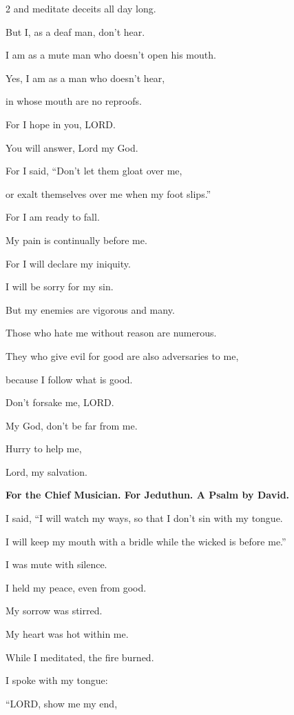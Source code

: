 \begin{multicols}{2}
	and meditate deceits all day long.
	
	
	\myverse{}But I, as a deaf man, don’t hear.
	
	I am as a mute man who doesn’t open his mouth.
	
	
	\myverse{}Yes, I am as a man who doesn’t hear,
	
	in whose mouth are no reproofs.
	
	
	\myverse{}For I hope in you, LORD.
	
	You will answer, Lord my God.
	
	
	\myverse{}For I said, “Don’t let them gloat over me,
	
	or exalt themselves over me when my foot slips.”
	
	
	\myverse{}For I am ready to fall.
	
	My pain is continually before me.
	
	
	\myverse{}For I will declare my iniquity.
	
	I will be sorry for my sin.
	
	
	\myverse{}But my enemies are vigorous and many.
	
	Those who hate me without reason are numerous.
	
	
	\myverse{}They who give evil for good are also adversaries to me,
	
	because I follow what is good.
	
	
	\myverse{}Don’t forsake me, LORD.
	
	My God, don’t be far from me.
	
	
	\myverse{}Hurry to help me,
	
	Lord, my salvation.
	
	
	\mychapter{}\textbf{For the Chief Musician. For Jeduthun. A Psalm by David.}
	
	\myverse*{}I said, “I will watch my ways, so that I don’t sin with my tongue.
	
	I will keep my mouth with a bridle while the wicked is before me.”
	
	
	\myverse{}I was mute with silence.
	
	I held my peace, even from good.
	
	My sorrow was stirred.
	
	
	\myverse{}My heart was hot within me.
	
	While I meditated, the fire burned.
	
	I spoke with my tongue:
	
	
	\myverse{}“LORD, show me my end,
	

\end{multicols}
